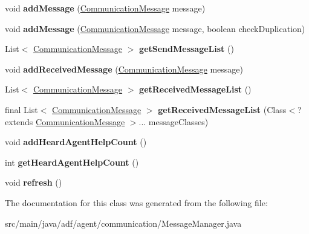 \begin{DoxyCompactItemize}
void {\bfseries add\+Message} (\hyperlink{classadf_1_1component_1_1communication_1_1CommunicationMessage}{Communication\+Message} message)
\item 
\hypertarget{classadf_1_1agent_1_1communication_1_1MessageManager_a445e867769a47fa04501ff9bed32c6f7}{}\label{classadf_1_1agent_1_1communication_1_1MessageManager_a445e867769a47fa04501ff9bed32c6f7} 
void {\bfseries add\+Message} (\hyperlink{classadf_1_1component_1_1communication_1_1CommunicationMessage}{Communication\+Message} message, boolean check\+Duplication)
\item 
\hypertarget{classadf_1_1agent_1_1communication_1_1MessageManager_a56927f8055dc3949d2cafeba97aecde4}{}\label{classadf_1_1agent_1_1communication_1_1MessageManager_a56927f8055dc3949d2cafeba97aecde4} 
List$<$ \hyperlink{classadf_1_1component_1_1communication_1_1CommunicationMessage}{Communication\+Message} $>$ {\bfseries get\+Send\+Message\+List} ()
\item 
\hypertarget{classadf_1_1agent_1_1communication_1_1MessageManager_a4076a624c7c86d1f06eaf21b02517518}{}\label{classadf_1_1agent_1_1communication_1_1MessageManager_a4076a624c7c86d1f06eaf21b02517518} 
void {\bfseries add\+Received\+Message} (\hyperlink{classadf_1_1component_1_1communication_1_1CommunicationMessage}{Communication\+Message} message)
\item 
\hypertarget{classadf_1_1agent_1_1communication_1_1MessageManager_a47ccf7490e73c9301e97b5b777dedae9}{}\label{classadf_1_1agent_1_1communication_1_1MessageManager_a47ccf7490e73c9301e97b5b777dedae9} 
List$<$ \hyperlink{classadf_1_1component_1_1communication_1_1CommunicationMessage}{Communication\+Message} $>$ {\bfseries get\+Received\+Message\+List} ()
\item 
\hypertarget{classadf_1_1agent_1_1communication_1_1MessageManager_abb2325441740fac0e5a5791e2630c5bf}{}\label{classadf_1_1agent_1_1communication_1_1MessageManager_abb2325441740fac0e5a5791e2630c5bf} 
final List$<$ \hyperlink{classadf_1_1component_1_1communication_1_1CommunicationMessage}{Communication\+Message} $>$ {\bfseries get\+Received\+Message\+List} (Class$<$? extends \hyperlink{classadf_1_1component_1_1communication_1_1CommunicationMessage}{Communication\+Message} $>$... message\+Classes)
\item 
\hypertarget{classadf_1_1agent_1_1communication_1_1MessageManager_a49c7d9417cf1f7e794bc83448e3f707e}{}\label{classadf_1_1agent_1_1communication_1_1MessageManager_a49c7d9417cf1f7e794bc83448e3f707e} 
void {\bfseries add\+Heard\+Agent\+Help\+Count} ()
\item 
\hypertarget{classadf_1_1agent_1_1communication_1_1MessageManager_aabf301db913e2f729563921eb27abe3b}{}\label{classadf_1_1agent_1_1communication_1_1MessageManager_aabf301db913e2f729563921eb27abe3b} 
int {\bfseries get\+Heard\+Agent\+Help\+Count} ()
\item 
\hypertarget{classadf_1_1agent_1_1communication_1_1MessageManager_abee15a64cb90093c36d27b603c47277a}{}\label{classadf_1_1agent_1_1communication_1_1MessageManager_abee15a64cb90093c36d27b603c47277a} 
void {\bfseries refresh} ()
\end{DoxyCompactItemize}


The documentation for this class was generated from the following file\+:\begin{DoxyCompactItemize}
\item 
src/main/java/adf/agent/communication/Message\+Manager.\+java\end{DoxyCompactItemize}
